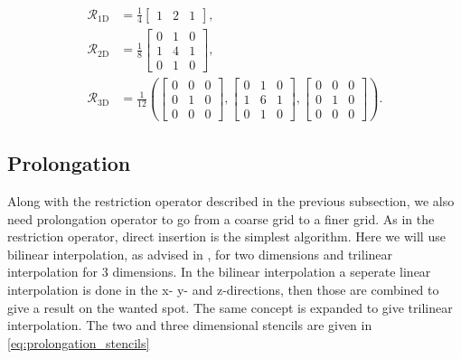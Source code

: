         	\begin{equation}
        		\begin{aligned}
        			\mathcal{R}_{1\text{D}} &= \frac{1}{4}
        			\begin{bmatrix}
        				1 & 2 & 1
        			\end{bmatrix},
        			\\
        			\mathcal{R}_{2\text{D}} &= \frac{1}{8}
        			\begin{bmatrix}
        				0 & 1 & 0
        				\\
        				1 & 4 & 1
        				\\
        				0 & 1 & 0
        			\end{bmatrix},
        			\\
        			\mathcal{R}_{3\text{D}} &= \frac{1}{12} \left(
        			\begin{bmatrix}
        				0 & 0 & 0
        				\\
        				0 & 1 & 0
        				\\
        				0 & 0 & 0
        			\end{bmatrix}
        			,
        			\begin{bmatrix}
        				0 & 1 & 0
        				\\
        				1 & 6 & 1
        				\\
        				0 & 1 & 0
        			\end{bmatrix}
        			,
        			\begin{bmatrix}
        				0 & 0 & 0
        				\\
        				0 & 1 & 0
        				\\
        				0 & 0 & 0
        			\end{bmatrix}
        			\right).
        			\label{eq:restriction_stencils}
        		\end{aligned}
        	\end{equation}

        \subsection{Prolongation}
            \label{sec:prol_simple}

            Along with the restriction operator described in the previous subsection, we also need prolongation
            operator to go from a coarse grid to a finer grid. As in the restriction
			operator, direct insertion is the simplest algorithm. Here we will use bilinear interpolation,
			as advised in \citet{trottenberg_multigrid_2000}, for
            two dimensions and trilinear interpolation for 3 dimensions. In the bilinear interpolation a seperate
            linear interpolation is done in the x- y- and z-directions, then those are combined to give a result
            on the wanted spot. The same concept is expanded to give trilinear
            interpolation. The two and three dimensional stencils are given in \eqref{eq:prolongation_stencils}

